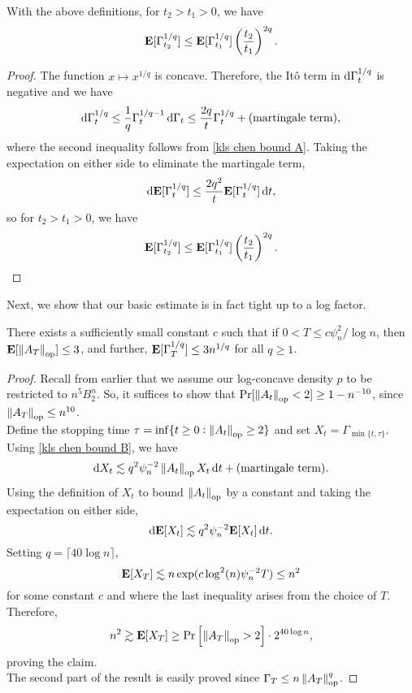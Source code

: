 		\begin{corollary}
			\label{chen: expectation of potential A}	
			With the above definitions, for $t_2 > t_1 > 0$, we have
			\begin{equation}
				\textbf{E}[\Gamma_{t_2}^{1/q}] \leq \textbf{E}[\Gamma_{t_1}^{1/q}] \left(\frac{t_2}{t_1}\right)^{2q}.	
			\end{equation}
		\end{corollary}
		\begin{proof}
			The function $x \mapsto x^{1/q}$ is concave. Therefore, the It\^{o} term in $\operatorname{d}\!{\Gamma_t^{1/q}}$ is negative and we have
			\[ \operatorname{d}\!{\Gamma_t^{1/q}} \leq \frac{1}{q} \Gamma_t^{1/q-1}\operatorname{d}\!{\Gamma_t} \leq \frac{2q}{t} \Gamma_t^{1/q} + \text{(martingale term)}, \]
			where the second inequality follows from \eqref{kls chen bound A}. Taking the expectation on either side to eliminate the martingale term,
			\[ \operatorname{d}\!{\textbf{E}[\Gamma_t^{1/q}]} \leq \frac{2q^2}{t} \textbf{E}[\Gamma_t^{1/q}]\operatorname{d}\!{t}, \]
			so for $t_2 > t_1 > 0$, we have
			\[ \textbf{E}[\Gamma_{t_2}^{1/q}] \leq \textbf{E}[\Gamma_{t_1}^{1/q}] \left(\frac{t_2}{t_1}\right)^{2q}. \qedhere \]
		\end{proof}

		Next, we show that our basic estimate  is in fact tight up to a log factor.

		\begin{corollary}
			\label{chen: expectation of potential B}
			There exists a sufficiently small constant $c$ such that if $0 < T \leq c \psi_n^2 / \log n$, then $\textbf{E}[\left\lVert A_T\right\rVert_{\text{op}}] \leq 3$, and further, $\textbf{E}[\Gamma_T^{1/q}] \leq 3n^{1/q}$ for all $q \geq 1$.
		\end{corollary}
		\begin{proof}
			Recall from earlier that we assume our log-concave density $p$ to be restricted to $n^5 B_2^n$. So, it suffices to show that $\Pr[\left\lVert A_t\right\rVert_{\text{op}} < 2] \geq 1 - n^{-10}$, since $\left\lVert A_T\right\rVert_{\text{op}} \leq n^{10}$.\\
			Define the stopping time $\tau = \inf\{t \geq 0 : \left\lVert A_t\right\rVert_{\text{op}} \geq 2 \}$ and set $X_t = \Gamma_{\min\{t,\tau\}}$. Using \eqref{kls chen bound B}, we have
			\[ \operatorname{d}\!{X_t} \lesssim q^2\psi_n^{-2}\left\lVert A_t\right\rVert_{\text{op}}X_t\operatorname{d}\!{t} + \text{(martingale term)}. \]
			Using the definition of $X_t$ to bound $\left\lVert A_t\right\rVert_{\text{op}}$ by a constant and taking the expectation on either side,
			\[ \operatorname{d}\!{\textbf{E}[X_t]} \lesssim q^2\psi_n^{-2}\textbf{E}[X_t]\operatorname{d}\!{t}. \]
			Setting $q = \lceil 40 \log n \rceil$,
			\[ \textbf{E}[X_T] \lesssim n \exp(c\log^2 (n)\psi_n^{-2}T) \leq n^2 \]
			for some constant $c$ and where the last inequality arises from the choice of $T$. Therefore,
			\[ n^2 \gtrsim \textbf{E}[X_T] \geq \Pr\left[ \left\lVert A_T\right\rVert_{\text{op}} > 2 \right] \cdot 2^{40 \log n}, \]
			proving the claim.\\
			The second part of the result is easily proved since $\Gamma_T \leq n\left\lVert A_T\right\rVert_{\text{op}}^q$.
		\end{proof}

